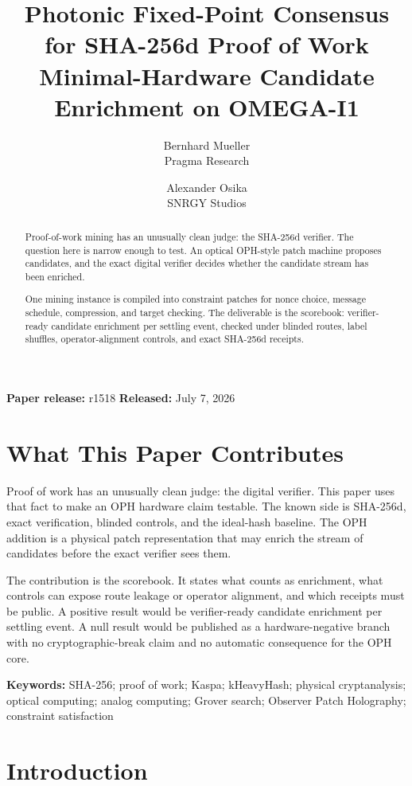 \documentclass[11pt]{article}
\title{\textbf{Photonic Fixed-Point Consensus for SHA-256d Proof of Work}\\[0.25em]
\large Minimal-Hardware Candidate Enrichment on OMEGA-I1}
\author{Bernhard Mueller\\Pragma Research \and Alexander Osika\\SNRGY Studios}
\date{\OPHPaperReleaseDate}
\theoremstyle{definition}
\theoremstyle{remark}
\newcommand{\OPHPaperReleaseID}{r1518}
\newcommand{\OPHPaperReleaseDate}{July 7, 2026}
\begin{document}
\maketitle
\begin{center}
\small\textbf{Paper release:} \OPHPaperReleaseID\quad
\textbf{Released:} \OPHPaperReleaseDate
\end{center}

\begin{abstract}
Proof-of-work mining has an unusually clean judge: the SHA-256d verifier. The question here is narrow enough to test. An optical OPH-style patch machine proposes candidates, and the exact digital verifier decides whether the candidate stream has been enriched.

One mining instance is compiled into constraint patches for nonce choice, message schedule, compression, and target checking. The deliverable is the scorebook: verifier-ready candidate enrichment per settling event, checked under blinded routes, label shuffles, operator-alignment controls, and exact SHA-256d receipts.
\end{abstract}

\section*{What This Paper Contributes}

Proof of work has an unusually clean judge: the digital verifier. This paper
uses that fact to make an OPH hardware claim testable. The known side is
SHA-256d, exact verification, blinded controls, and the ideal-hash baseline.
The OPH addition is a physical patch representation that may enrich the stream
of candidates before the exact verifier sees them.

The contribution is the scorebook. It states what counts as enrichment, what
controls can expose route leakage or operator alignment, and which receipts
must be public. A positive result would be verifier-ready candidate enrichment
per settling event. A null result would be published as a hardware-negative
branch with no cryptographic-break claim and no automatic consequence for the
OPH core.

\noindent\textbf{Keywords:} SHA-256; proof of work; Kaspa; kHeavyHash;
physical cryptanalysis; optical computing; analog computing; Grover search;
Observer Patch Holography; constraint satisfaction

\section{Introduction}
\end{document}
